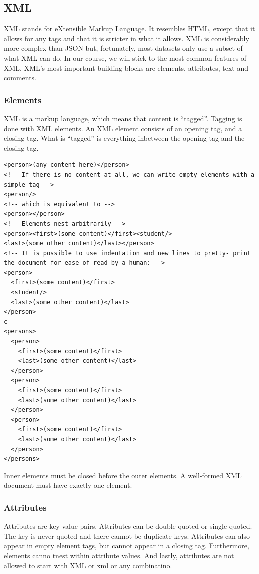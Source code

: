 \subsection{XML}
XML stands for eXtensible Markup Language. It resembles HTML, except that it allows for any tags and that it is stricter in what it allows. XML is considerably more complex than JSON but, fortunately, most datasets only use a subset of what XML can do. In our course, we will stick to the most common features of XML. XML’s most important building blocks are elements, attributes, text and comments.

\subsubsection{Elements}
XML is a markup language, which means that content is “tagged”. Tagging is done with XML elements. An XML element consists of an opening tag, and a closing tag. What is “tagged” is everything inbetween the opening tag and the closing tag.

\begin{lstlisting}[style=xml, caption={Example XML code}, label={lst:xml1}]
<person>(any content here)</person>
<!-- If there is no content at all, we can write empty elements with a simple tag -->
<person/>
<!-- which is equivalent to -->
<person></person>
<!-- Elements nest arbitrarily -->
<person><first>(some content)</first><student/>
<last>(some other content)</last></person>
<!-- It is possible to use indentation and new lines to pretty- print the document for ease of read by a human: -->
<person>
  <first>(some content)</first>
  <student/>
  <last>(some other content)</last>
</person>
c
<persons>
  <person>
    <first>(some content)</first>
    <last>(some other content)</last>
  </person>
  <person>
    <first>(some content)</first>
    <last>(some other content)</last>
  </person>
  <person>
    <first>(some content)</first>
    <last>(some other content)</last>
  </person>
</persons>
\end{lstlisting}
Inner elements must be closed before the outer elements. A well-formed XML document must have exactly one element.

\subsubsection{Attributes}
Attributes are key-value pairs. Attributes can be double quoted or single quoted. The key is never quoted and there cannot be duplicate keys. Attributes can also appear in empty element tags, but cannot appear in a closing tag. Furthermore, elements canno tnest within attribute values. And lastly, attributes are not allowed to start with XML or xml or any combinatino.

